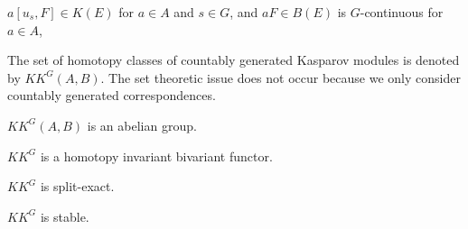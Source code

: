 \documentclass{../../large}
\begin{document}
\begin{prb}

$a[u_s,F]\in K(E)$ for $a\in A$ and $s\in G$, and $aF\in B(E)$ is $G$-continuous for $a\in A$,
\end{prb}


\begin{prb}
The set of homotopy classes of countably generated Kasparov modules is denoted by $KK^G(A,B)$.
The set theoretic issue does not occur because we only consider countably generated correspondences.

\begin{parts}
\item $KK^G(A,B)$ is an abelian group.
\item $KK^G$ is a homotopy invariant bivariant functor.
\item $KK^G$ is split-exact.
\item $KK^G$ is stable.
\end{parts}
\end{prb}
\end{document}
